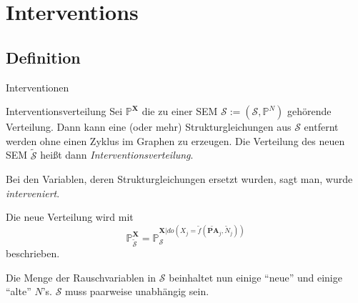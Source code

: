 \section{Interventions}
\subsection{Definition}
\begin{frame}{Interventionen}
    \begin{block}{Interventionsverteilung}
        Sei $\mathbb{P}^\mathbf{X}$ die zu einer SEM
        $\mathcal{S} := (\mathcal{S}, \mathbb{P}^N)$ gehörende Verteilung. Dann
        kann eine (oder mehr) Strukturgleichungen aus $\mathcal{S}$ entfernt
        werden ohne einen Zyklus im Graphen zu erzeugen. Die Verteilung des
        neuen SEM $\tilde{\mathcal{S}}$ heißt dann
        \textit{Interventionsverteilung}.

        Bei den Variablen, deren Strukturgleichungen ersetzt wurden, sagt man,
        wurde \textit{interveniert}.

        Die neue Verteilung wird mit
        \[\mathbb{P}_{\tilde{\mathcal{S}}}^{\mathbf{X}} = \mathbb{P}_{\mathcal{S}}^{\mathbf{X}| do(X_j=\tilde{f}(\tilde{\mathbf{PA}}_j, \tilde{N}_j))}\]
        beschrieben.

        Die Menge der Rauschvariablen in $\mathcal{S}$ beinhaltet nun einige
        \enquote{neue} und einige \enquote{alte} $N$'s. $\mathcal{S}$ muss
        paarweise unabhängig sein.
    \end{block}
\end{frame}

